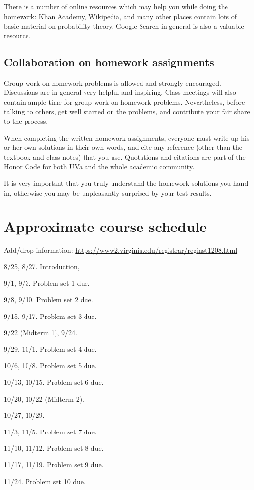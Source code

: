 \documentclass[oneside,11pt]{amsart}
\begin{document}
There is a number of online resources which may help you while doing the homework:
Khan Academy, Wikipedia, and many other 
places contain lots of basic material on probability theory. Google Search
in general
is also a valuable resource.

\subsection{Collaboration on homework assignments}
\label{collaboration}

Group work on homework problems is allowed and strongly encouraged.
Discussions are in general very
helpful and inspiring. Class meetings will also contain ample time
for group work on homework problems.
Nevertheless, before talking to others, get well started
on the problems, and contribute your fair share to the process. 

When completing the written homework assignments, everyone must write up his or her own
solutions in their own words, and cite any reference 
(other than the textbook and
class notes) that you use. Quotations and citations are part of the Honor Code for both UVa
and the whole academic community. 

It is very important that you truly understand the homework solutions you hand
in, otherwise you may be unpleasantly surprised by your test results.

\section{Approximate course schedule}

\noindent Add/drop information: \url{https://www2.virginia.edu/registrar/reginst1208.html}
\bigskip

\begin{enumerate}[\bf{}{[}week 1{]}]
	\item 8/25, 8/27. Introduction, 
	\item 9/1, 9/3. Problem set 1 due.
	\item 9/8, 9/10. Problem set 2 due.
	\item 9/15, 9/17. Problem set 3 due.
	\item 9/22 (Midterm 1), 9/24.
	\item 9/29, 10/1. Problem set 4 due.
	\item 10/6, 10/8. Problem set 5 due.
	\item 10/13, 10/15. Problem set 6 due.
	\item 10/20, 10/22 (Midterm 2).
	\item 10/27, 10/29. 
	\item 11/3, 11/5. Problem set 7 due.
	\item 11/10, 11/12. Problem set 8 due.
	\item 11/17, 11/19. Problem set 9 due.
	\item 11/24. Problem set 10 due.
\end{enumerate}
\end{document}
